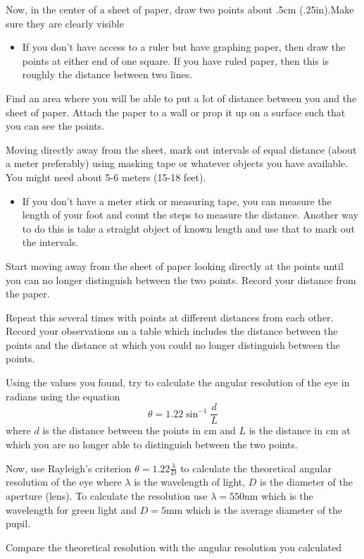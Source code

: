 \begin{steps}
	\item Now, in the center of a sheet of paper, draw two points about .5cm (.25in).Make sure they are clearly visible 

\begin{itemize}
	\item If you don't have access to a ruler but have graphing paper, then draw the points at either end of one square. If you have ruled paper, then this is roughly the distance between two lines. 
\end{itemize}

	\item Find an area where you will be able to put a lot of distance between you and the sheet of paper. Attach the paper to a wall or prop it up on a surface such that you can see the points. 
	
	\item Moving directly away from the sheet, mark out intervals of equal distance (about a meter preferably) using masking tape or whatever objects you have available. You might need about 5-6 meters (15-18 feet).
	
	\begin{itemize}
		\item If you don't have a meter stick or measuring tape, you can measure the length of your foot and count the steps to measure the distance. Another way to do this is take a straight object of known length and use that to mark out the intervals. 
	\end{itemize}

	\item Start moving away from the sheet of paper looking directly at the points until you can no longer distinguish between the two points. Record your distance from the paper. 
	
	\item Repeat this several times with points at different distances from each other. Record your observations on a table which includes the distance between the points and the distance at which you could no longer distinguish between the points. 
	
	\item Using the values you found, try to calculate the angular resolution of the eye in radians using the equation $$\theta = 1.22\sin^{-1}{\frac{d}{L}}$$ where $d$ is the distance between the points in cm and $L$ is the distance in cm at which you are no longer able to distinguish between the two points. 
	
	\item Now, use Rayleigh's criterion $\theta = 1.22 \frac{\lambda}{D}$ to calculate the theoretical angular resolution of the eye where $\lambda$ is the wavelength of light, $D$ is the diameter of the aperture (lens). To calculate the resolution use $\lambda = 550$nm which is the wavelength for green light and $D=5$mm which is the average diameter of the pupil. 
	
	\item Compare the theoretical resolution with the angular resolution you calculated
\end{steps}
